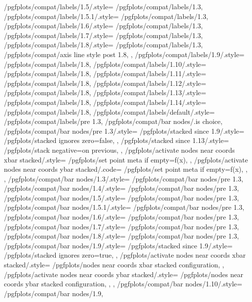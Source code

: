 {	/pgfplots/compat/labels/1.5/.style=		{/pgfplots/compat/labels/1.3},%
	/pgfplots/compat/labels/1.5.1/.style=	{/pgfplots/compat/labels/1.3},%
	/pgfplots/compat/labels/1.6/.style=		{/pgfplots/compat/labels/1.3},%
	/pgfplots/compat/labels/1.7/.style=		{/pgfplots/compat/labels/1.3},%
	/pgfplots/compat/labels/1.8/.style=		{
		/pgfplots/compat/labels/1.3,
		/pgfplots/compat/axis line style post 1.8,
	},%
	/pgfplots/compat/labels/1.9/.style=		{/pgfplots/compat/labels/1.8},%
	/pgfplots/compat/labels/1.10/.style=		{/pgfplots/compat/labels/1.8},%
	/pgfplots/compat/labels/1.11/.style=		{/pgfplots/compat/labels/1.8},%
	/pgfplots/compat/labels/1.12/.style=		{/pgfplots/compat/labels/1.8},%
	/pgfplots/compat/labels/1.13/.style=		{/pgfplots/compat/labels/1.8},%
	/pgfplots/compat/labels/1.14/.style=		{/pgfplots/compat/labels/1.8},%
	/pgfplots/compat/labels/default/.style=	{/pgfplots/compat/labels/pre 1.3},%
	/pgfplots/compat/bar nodes/.is choice,
	/pgfplots/compat/bar nodes/pre 1.3/.style={%
		/pgfplots/stacked since 1.9/.style={
			/pgfplots/stacked ignores zero=false,%
		},%
		/pgfplots/stacked since 1.13/.style={
			/pgfplots/stack negative=on previous,%
		},%
		/pgfplots/activate nodes near coords xbar stacked/.style={%
			/pgfplots/set point meta if empty=f(x),%
		},%
		/pgfplots/activate nodes near coords ybar stacked/.code={%
			/pgfplots/set point meta if empty=f(x),%
		},%
	},%
	/pgfplots/compat/bar nodes/1.3/.style=		{/pgfplots/compat/bar nodes/pre 1.3},%
	/pgfplots/compat/bar nodes/1.4/.style=		{/pgfplots/compat/bar nodes/pre 1.3},%
	/pgfplots/compat/bar nodes/1.5/.style=		{/pgfplots/compat/bar nodes/pre 1.3},%
	/pgfplots/compat/bar nodes/1.5.1/.style=	{/pgfplots/compat/bar nodes/pre 1.3},%
	/pgfplots/compat/bar nodes/1.6/.style=		{/pgfplots/compat/bar nodes/pre 1.3},%
	/pgfplots/compat/bar nodes/1.7/.style=		{/pgfplots/compat/bar nodes/pre 1.3},%
	/pgfplots/compat/bar nodes/1.8/.style=		{/pgfplots/compat/bar nodes/pre 1.3},%
	/pgfplots/compat/bar nodes/1.9/.style=		{
		/pgfplots/stacked since 1.9/.style={
			/pgfplots/stacked ignores zero=true,%
		},
		/pgfplots/activate nodes near coords xbar stacked/.style={
			/pgfplots/nodes near coords xbar stacked configuration,
		},
		/pgfplots/activate nodes near coords ybar stacked/.style={
			/pgfplots/nodes near coords ybar stacked configuration,
		},
	},%
	/pgfplots/compat/bar nodes/1.10/.style=		{/pgfplots/compat/bar nodes/1.9},%
}
